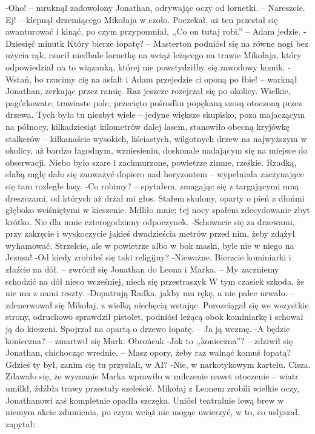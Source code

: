 \documentclass[../MAIN.tex]{subfiles}
\begin{document}
-Oho! -- mruknął zadowolony Jonathan, odrywając oczy od lornetki. -- Nareszcie. Ej! -- klepnął drzemiącego Mikołaja w czoło. Poczekał, aż ten przestał się awanturować i klnąć, po czym przypomniał, ,,Co on tutaj robi.'' -- Adam jedzie.
-Dziesięć minut\3k Który bierze łopatę? -- Masterton podniósł się na równe nogi bez użycia rąk, rzucił niedbale lornetkę na wciąż leżącego na trawie Mikołaja, który odpowiedział na to wiązanką, której nie powstydziłby się zawodowy komik.
-Wstań, bo rzucimy cię na asfalt i Adam przejedzie ci oponą po łbie! -- warknął Jonathan, zerkając przez ramię. Raz jeszcze rozejrzał się po okolicy.
Wielkie, pagórkowate, trawiaste pole, przecięto pośrodku popękaną szosą otoczoną przez drzewa. Tych było tu niezbyt wiele -- jedyne większe skupisko, poza majaczącym na północy, kilkadziesiąt kilometrów dalej lasem, stanowiło obecną kryjówkę stalkerów -- kilkanaście wysokich, liściastych, wilgotnych drzew na najwyższym w okolicy, aż bardzo łagodnym, wzniesieniu, doskonale nadającym się na miejsce do obserwacji. Niebo było szare i zachmurzone, powietrze zimne, rześkie. Rzadką, słabą mgłę dało się zauważyć dopiero nad horyzontem -- wypełniała zaczynające się tam rozległe lasy.
-Co robimy? -- spytałem, zmagając się z targającymi mną dreszczami, od których aż drżał mi głos. Stałem skulony, oparty o pień z dłońmi głęboko wciśniętymi w kieszenie. Mdliło mnie; tej nocy spałem zdecydowanie zbyt krótko. Nie dla mnie czterogodzinny odpoczynek.
-Schowacie się za drzewami, przy zakręcie i wyskoczycie jakieś dwadzieścia metrów przed nim, żeby zdążył wyhamować. Strzelcie, ale w powietrze albo w bok maski, byle nie w niego na Jezusa!
-Od kiedy zrobiłeś się taki religijny?
-Nieważne. Bierzcie kominiarki i złaźcie na dół. -- zwrócił się Jonathan do Leona i Marka. -- My zaczniemy schodzić na dół nieco wcześniej, niech się przestraszy\3k W tym czasie\3k szkoda, że nie ma z nami reszty.
-Dopatrują Radka, jakby mu rękę, a nie palec urwało. -- zdenerwował się Mikołaj, z wielką niechęcią wstając. Porozciągał się we wszystkie strony, odruchowo sprawdził pistolet, podniósł leżącą obok kominiarkę i schował ją do kieszeni. Spojrzał na opartą o drzewo łopatę. -- Ja ją wezmę.
-A będzie konieczna? -- zmartwił się Mark. Obrońca\3k
-Jak to ,,konieczna''? -- zdziwił się Jonathan, chichocząc wrednie. -- Masz opory, żeby raz walnąć komuś łopatą? Gdzieś ty był, zanim cię tu przysłali, w AI?
-Nie, w narkotykowym kartelu.
Cisza. Zdawało się, że wyznanie Marka wprawiło w milczenie nawet otoczenie -- wiatr umilkł, źdźbła trawy przestały szeleścić. Mikołaj z Leonem zrobili wielkie oczy, Jonathanowi zaś kompletnie opadła szczęka. Uniósł teatralnie lewą brew w niemym akcie zdumienia, po czym wciąż nie mogąc uwierzyć, w to, co usłyszał, zapytał:
\end{document}
